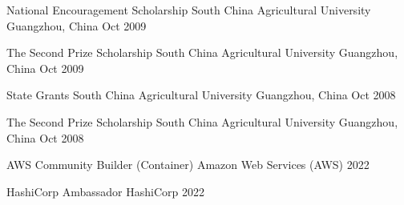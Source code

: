



\begin{cvhonors}

  \cvhonor
    {National Encouragement Scholarship} %
    {South China Agricultural University} %
    {Guangzhou, China} %
    {Oct 2009} %

  \cvhonor
    {The Second Prize Scholarship} %
    {South China Agricultural University} %
    {Guangzhou, China} %
    {Oct 2009} %

  \cvhonor
    {State Grants} %
    {South China Agricultural University} %
    {Guangzhou, China} %
    {Oct 2008} %

  \cvhonor
    {The Second Prize Scholarship} %
    {South China Agricultural University} %
    {Guangzhou, China} %
    {Oct 2008} %

\end{cvhonors}



\begin{cvhonors}

  \cvhonor
    {AWS Community Builder (Container)} %
    {Amazon Web Services (AWS)} %
    {} %
    {2022} %

  \cvhonor
    {HashiCorp Ambassador} %
    {HashiCorp} %
    {} %
    {2022} %

\end{cvhonors}
